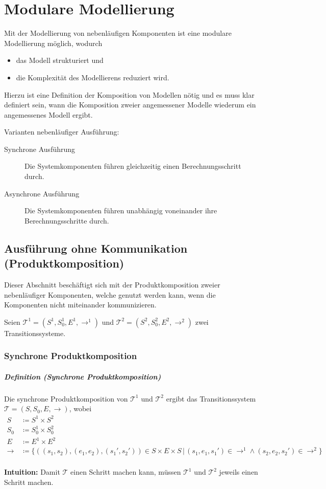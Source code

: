 \documentclass[a4paper, 11pt, accentcolor = tud3b]{tudreport}
\newcommand{\forwhich}{\ensuremath{{\,\vert\,}}}
\newcommand{\subsubparagraph}[1]{\hspace{1cm} \textbf{#1:}}
\newcommand{\definition}[2]{\subparagraph{Definition (#1)} #2}
\newcommand{\intuition}[1]{\subsubparagraph{Intuition} #1}
\begin{document}
	    \section{Modulare Modellierung}
		    Mit der Modellierung von nebenläufigen Komponenten ist eine modulare Modellierung möglich, wodurch
		    \begin{itemize}
		    	\item das Modell strukturiert und
		    	\item die Komplexität des Modellierens reduziert wird.
		    \end{itemize}
		    Hierzu ist eine Definition der Komposition von Modellen nötig und es muss klar definiert sein, wann die Komposition zweier angemessener Modelle wiederum ein angemessenes Modell ergibt.
	    
		    Varianten nebenläufiger Ausführung:
		    \begin{description}
		    	\item[Synchrone Ausführung] Die Systemkomponenten führen gleichzeitig einen Berechnungsschritt durch.
		    	\item[Asynchrone Ausführung] Die Systemkomponenten führen unabhängig voneinander ihre Berechnungsschritte durch.
		    \end{description}
	    
		    \subsection{Ausführung ohne Kommunikation (Produktkomposition)}
				Dieser Abschnitt beschäftigt sich mit der Produktkomposition zweier nebenläufiger Komponenten, welche genutzt werden kann, wenn die Komponenten nicht miteinander kommunizieren.

				Seien $ \mathcal{T} ^ 1 = (S ^ 1, S _ 0 ^ 1, E ^ 1, \rightarrow ^ 1) $ und $ \mathcal{T} ^ 2 = (S ^ 2, S _ 0 ^ 2, E ^ 2, \rightarrow ^ 2) $ zwei Transitionssysteme.

			    \subsubsection{Synchrone Produktkomposition}
				    \definition{Synchrone Produktkomposition}{
				    	Die synchrone Produktkomposition von $ \mathcal{T} ^ 1 $ und $ \mathcal{T} ^ 2 $ ergibt das Transitionssystem $ \mathcal{T} = (S, S _ 0, E, \rightarrow) $, wobei
				    	\begin{align*}
					    	S &\coloneqq S ^ 1 \times S ^ 2 \\
					    	S _ 0 &\coloneqq S _ 0 ^ 1 \times S _ 0 ^ 2 \\
					    	E &\coloneqq E ^ 1 \times E ^ 2 \\
					    	\rightarrow\, &\coloneqq \{ ((s _ 1, s _ 2), (e _ 1, e _ 2), (s _ 1 ', s _ 2 ')) \in S \times E \times S \forwhich (s _ 1, e _ 1, s _ 1 ') \in \rightarrow ^ 1 \land (s _ 2, e _ 2, s _ 2 ') \in \rightarrow ^ 2 \} \\
				    	\end{align*}
				    	
				    	\intuition{Damit $ \mathcal{T} $ einen Schritt machen kann, müssen $ \mathcal{T} ^ 1 $ und $ \mathcal{T} ^ 2 $ jeweils einen Schritt machen.}
				    }
			    
\end{document}
